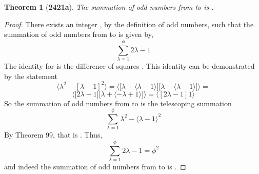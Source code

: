 \documentclass[preview]{standalone}
\newtheorem{theorem}{Theorem}
\begin{document}
\begin{theorem}[\textbf{2421a}]
    The summation of odd numbers from  to \bm{$\phi$} is 
    .
\end{theorem}

\begin{proof}
    There exists an integer \bm{$\lambda$}, by the definition of odd numbers, such that
    the summation of odd numbers from  to \bm{$\phi$} is given by, 
    \begin{equation*}
        \sum_{\lambda=1}^\phi 
                2 \lambda - 1
    \end{equation*}
    The identity for  is the difference of squares 
    . 
    This identity can be demonstrated by the statement 
    \begin{equation*}
        \bigg \langle \lambda ^2 - [ \lambda - 1 ] ^2 \bigg \rangle
            = 
        \bigg \langle 
            \bigg[ 
                \lambda  + \langle \lambda - 1 \rangle 
            \bigg]
            \bigg[
                \lambda - \langle \lambda - 1 \rangle 
            \bigg] 
        \bigg \rangle
            =
    \end{equation*}
    \begin{equation*} 
        \bigg \langle 
            \bigg[
                2 \lambda - 1
            \bigg]
            \bigg[
                \lambda + \langle - \lambda + 1 \rangle
            \bigg]
        \bigg \rangle
            = 
        \bigg \langle [ 2 \lambda - 1 ] 1 \bigg \rangle
    \end{equation*}
    So the summation of odd numbers from  to \bm{$\phi$} 
    is the telescoping summation
    \begin{equation*}
        \sum_{\lambda=1}^\phi 
                \lambda ^2 - \langle \lambda - 1 \rangle ^2
    \end{equation*}
    By Theorem 99, that is . 
    Thus, 
    \begin{equation*}
        \sum_{\lambda=1}^\phi 2 \lambda - 1 = \phi^2
    \end{equation*}
    and indeed the summation of odd numbers from  to \bm{$\phi$} 
    is .
\end{proof}
\end{document}

